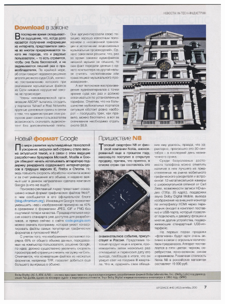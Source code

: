 \documentclass{book}
\begin{document}
\begin{figure}[H]
\begin{center}
\includegraphics[scale=0.25]{images/4.jpg}

\end{center}
\end{figure}
\end{document}
